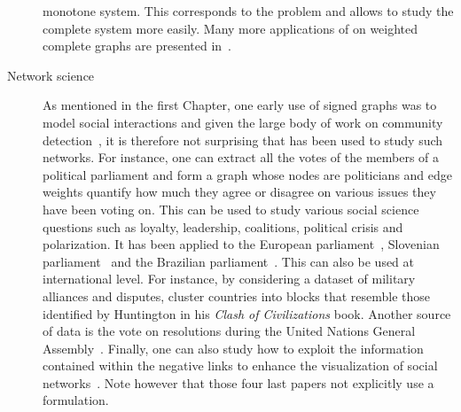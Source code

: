 \begin{description}
      monotone system. This corresponds to the \mind{} problem and allows to study
      the complete system more easily. Many more applications of \mind{} on weighted complete graphs
      are presented in~\autocite[Section 6]{clusterEditSurvey13}.

   \item[Network science]
      As mentioned in the first Chapter, one early use of signed graphs was to model social
      interactions and given the large body of work on community
      detection~\autocite{FortunatoSurvey10}, it is therefore not surprising that \pcc{} has been
      used to study such networks. For instance, one can extract all the votes of the members of a
      political parliament and form a graph whose nodes are politicians and edge weights quantify how
      much they agree or disagree on various issues they have been voting on. This can be used to
      study various social science questions such as loyalty, leadership, coalitions, political
      crisis and polarization. It has been applied to the European
      parliament~\autocite{Mendonca2015}, Slovenian parliament~\autocite{Jiang2015} and the
      Brazilian parliament~\autocites{BrazilCC17}. This can also be used at international level. For
      instance, by considering a dataset of military alliances and disputes, \textcite{Traag2009}
      cluster countries into blocks that resemble those identified by Huntington in his \emph{Clash
      of Civilizations} book. Another source of data is the vote on resolutions during the United
      Nations General Assembly~\autocite{CommunityUN12}. Finally, one can also study how to exploit
      the information contained within the negative links to enhance the visualization of social
      networks~\autocites{Luca10}{drawingSignedGraphs11}. Note however that those four last papers
      not explicitly use a \pcc{} formulation.


\end{description}
